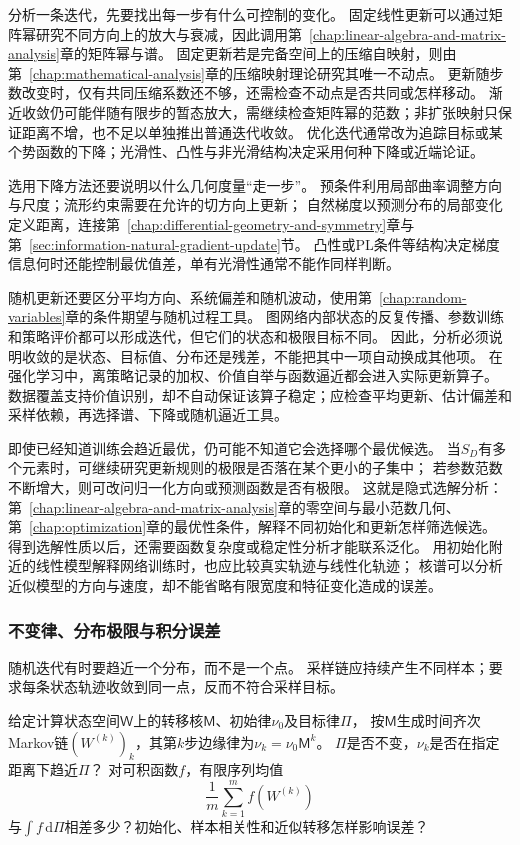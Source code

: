 分析一条迭代，先要找出每一步有什么可控制的变化。
固定线性更新可以通过矩阵幂研究不同方向上的放大与衰减，因此调用第~\ref{chap:linear-algebra-and-matrix-analysis}章的矩阵幂与谱。
固定更新若是完备空间上的压缩自映射，则由第~\ref{chap:mathematical-analysis}章的压缩映射理论研究其唯一不动点。
更新随步数改变时，仅有共同压缩系数还不够，还需检查不动点是否共同或怎样移动。
渐近收敛仍可能伴随有限步的暂态放大，需继续检查矩阵幂的范数；非扩张映射只保证距离不增，也不足以单独推出普通迭代收敛。
优化迭代通常改为追踪目标或某个势函数的下降；光滑性、凸性与非光滑结构决定采用何种下降或近端论证。

选用下降方法还要说明以什么几何度量“走一步”。
预条件利用局部曲率调整方向与尺度；流形约束需要在允许的切方向上更新；
自然梯度以预测分布的局部变化定义距离，连接第~\ref{chap:differential-geometry-and-symmetry}章与第~\ref{sec:information-natural-gradient-update}节。
凸性或PL条件等结构决定梯度信息何时还能控制最优值差，单有光滑性通常不能作同样判断。

随机更新还要区分平均方向、系统偏差和随机波动，使用第~\ref{chap:random-variables}章的条件期望与随机过程工具。
图网络内部状态的反复传播、参数训练和策略评价都可以形成迭代，但它们的状态和极限目标不同。
因此，分析必须说明收敛的是状态、目标值、分布还是残差，不能把其中一项自动换成其他项。
在强化学习中，离策略记录的加权、价值自举与函数逼近都会进入实际更新算子。
数据覆盖支持价值识别，却不自动保证该算子稳定；应检查平均更新、估计偏差和采样依赖，再选择谱、下降或随机逼近工具。

即使已经知道训练会趋近最优，仍可能不知道它会选择哪个最优候选。
当$S_D$有多个元素时，可继续研究更新规则的极限是否落在某个更小的子集中；
若参数范数不断增大，则可改问归一化方向或预测函数是否有极限。
这就是隐式选解分析：第~\ref{chap:linear-algebra-and-matrix-analysis}章的零空间与最小范数几何、
第~\ref{chap:optimization}章的最优性条件，解释不同初始化和更新怎样筛选候选。
得到选解性质以后，还需要函数复杂度或稳定性分析才能联系泛化。
用初始化附近的线性模型解释网络训练时，也应比较真实轨迹与线性化轨迹；
核谱可以分析近似模型的方向与速度，却不能省略有限宽度和特征变化造成的误差。

\subsubsection{不变律、分布极限与积分误差}
\label{sec:future-analysis-sampling-dynamics}

随机迭代有时要趋近一个分布，而不是一个点。
采样链应持续产生不同样本；要求每条状态轨迹收敛到同一点，反而不符合采样目标。

\begin{mathproblem}[随机计算的分布极限与积分误差]
  \label{question:future-sampling-dynamics}
  给定计算状态空间$\mathsf W$上的转移核$\mathsf M$、初始律$\nu_0$及目标律$\Pi$，
  按$\mathsf M$生成时间齐次Markov链$(W^{(k)})_k$，其第$k$步边缘律为$\nu_k=\nu_0\mathsf M^k$。
  $\Pi$是否不变，$\nu_k$是否在指定距离下趋近$\Pi$？
  对可积函数$f$，有限序列均值
  \[
    \frac1m\sum_{k=1}^m f(W^{(k)})
  \]
  与$\int f\,\mathrm d\Pi$相差多少？初始化、样本相关性和近似转移怎样影响误差？
\end{mathproblem}

